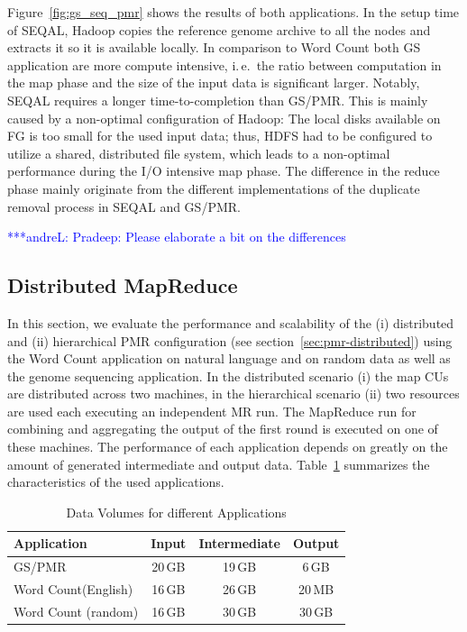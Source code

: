 \documentclass{acm_proc_article-sp}
\newcommand{\alnote}[1]{ {\textcolor{blue} { ***andreL: #1 }}}
\newcommand{\alnote}[1]{}
\begin{document}
Figure~\ref{fig:gs_seq_pmr} shows the results of both applications. In the
setup time of SEQAL, Hadoop copies the reference genome archive to all the 
nodes and extracts it so it is available locally.
In comparison to Word Count both GS application are more compute intensive,
i.\,e.\ the ratio between computation in the map phase and the size of the input
data is significant larger. Notably, SEQAL requires a longer time-to-completion
than GS/PMR. This is mainly caused by a non-optimal configuration of Hadoop: The
local disks available on FG is too small for the used input data; thus, HDFS had
to be configured to utilize a shared, distributed file system, which leads to a
non-optimal performance during the I/O intensive map phase. The difference in
the reduce phase mainly originate from the different implementations of the
duplicate removal process in SEQAL and GS/PMR. 

\alnote{Pradeep: Please elaborate a bit on the differences}

\subsection{Distributed MapReduce}

In this section, we evaluate the performance and scalability of the (i)
distributed and (ii) hierarchical PMR configuration (see
section~\ref{sec:pmr-distributed}) using the Word Count application on natural
language and on random data as well as the genome sequencing application. In the
distributed scenario (i) the map CUs are distributed across two machines, in the
hierarchical scenario (ii) two resources are used each executing an independent
MR run. The MapReduce run for combining and aggregating the output of the first
round is executed on one of these machines. The performance of each application
depends on greatly on the amount of generated intermediate and output data.
Table~\ref{tab:data-volumes} summarizes the characteristics of the used
applications.

\begin{table}[h]
	\centering
\begin{tabular}{|p{2cm}|c|c|c|}
\hline
\textbf{Application} &\textbf{Input} &\textbf{Intermediate} &\textbf{Output}\\
\hline
GS/PMR 		&20\,GB &19\,GB		 &6\,GB\\
\hline
Word Count\linebreak[4] (English) &16\,GB&26\,GB&20\,MB\\
\hline
Word Count (random) &16\,GB&30\,GB&30\,GB\\
\hline
\end{tabular}
\caption{Data Volumes for different Applications}
\label{tab:data-volumes}
\end{table}
\end{document}
